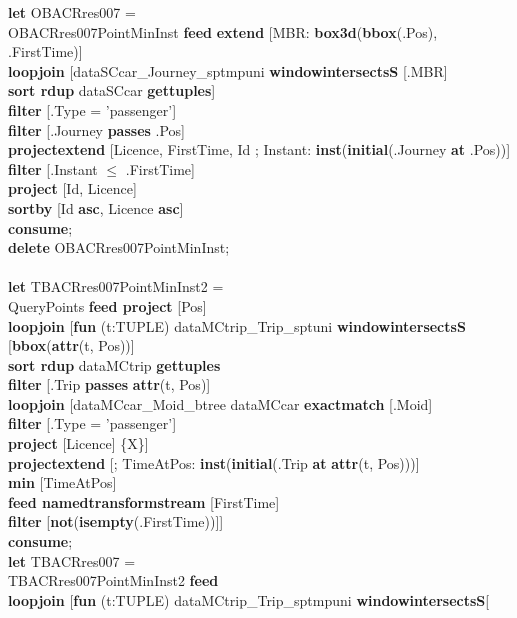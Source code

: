 \documentclass[a4paper]{article}
\newcommand{\op}[1]{\textbf{#1}}
\begin{document}
\begin{scriptsize}
\begin{tabbing}
\op{let} OBACRres007 =\\
\>OBACRres007PointMinInst \op{feed} \op{extend} [MBR: \op{box3d}(\op{bbox}(.Pos), .FirstTime)]\\
\>\op{loopjoin} [dataSCcar\_Journey\_sptmpuni \op{windowintersectsS} [.MBR]\\
\>\>\op{sort rdup} dataSCcar \op{gettuples}]\\
\>\op{filter} [.Type = 'passenger']\\
\>\op{filter} [.Journey \op{passes} .Pos]\\
\>\op{projectextend} [Licence, FirstTime, Id ; Instant: \op{inst}(\op{initial}(.Journey \op{at} .Pos))]\\
\>\op{filter} [.Instant $\leq$ .FirstTime]\\
\>\op{project} [Id, Licence]\\
\>\op{sortby} [Id \op{asc}, Licence \op{asc}]\\
\op{consume};\\
\op{delete} OBACRres007PointMinInst;\\
\\
\op{let} TBACRres007PointMinInst2 =\\
\>QueryPoints \op{feed project} [Pos]\\
\>\op{loopjoin} [\op{fun} (t:TUPLE) dataMCtrip\_Trip\_sptuni \op{windowintersectsS} [\op{bbox}(\op{attr}(t, Pos))]\\
\>\>\op{sort rdup} dataMCtrip \op{gettuples}\\
\>\>\op{filter} [.Trip \op{passes} \op{attr}(t, Pos)]\\
\>\>\op{loopjoin} [dataMCcar\_Moid\_btree dataMCcar \op{exactmatch} [.Moid]\\
\>\>\>\op{filter} [.Type = 'passenger']\\
\>\>\>\op{project} [Licence] \{X\}]\\
\>\>\op{projectextend} [; TimeAtPos: \op{inst}(\op{initial}(.Trip \op{at} \op{attr}(t, Pos)))]\\
\>\>\op{min} [TimeAtPos]\\
\>\>\op{feed namedtransformstream} [FirstTime]\\
\>\>\op{filter} [\op{not}(\op{isempty}(.FirstTime))]]\\
\op{consume};\\
\op{let} TBACRres007 =\\
\>TBACRres007PointMinInst2 \op{feed}\\
\>\op{loopjoin} [\op{fun} (t:TUPLE) dataMCtrip\_Trip\_sptmpuni \op{windowintersectsS}[\\

\end{tabbing}
\end{scriptsize}
\end{document}

